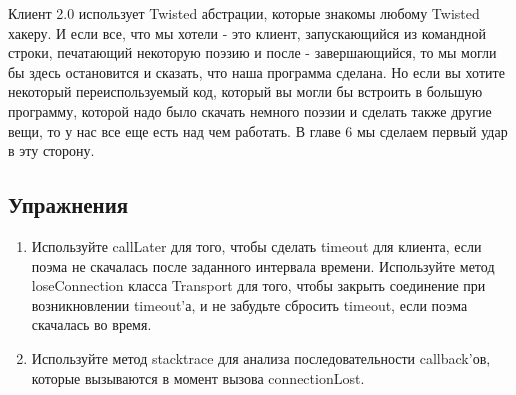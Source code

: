 
Клиент 2.0 использует Twisted абстрации, которые 
знакомы любому Twisted хакеру. И если все, что мы хотели - 
это клиент, запускающийся из командной строки, печатающий 
некоторую поэзию и после - завершающийся, то мы могли бы здесь остановится и 
сказать, что наша программа сделана. Но если вы хотите некоторый 
переиспользуемый код, который вы могли 
бы встроить в большую программу, которой надо было 
скачать немного поэзии и сделать также другие вещи, то у нас все 
еще есть над чем работать. В главе 6 мы сделаем первый удар в эту сторону.

\subsection{Упражнения}

\begin{enumerate}
\item Используйте callLater для того, чтобы сделать timeout для клиента, 
если поэма не скачалась после заданного интервала времени. 
Используйте метод loseConnection класса Transport  для того, чтобы закрыть соединение 
при возникновлении timeout'а, и не забудьте сбросить timeout, если 
поэма скачалась во время. 
\item Используйте метод stacktrace для анализа последовательности 
callback'ов, которые вызываются в момент вызова connectionLost.
\end{enumerate}

